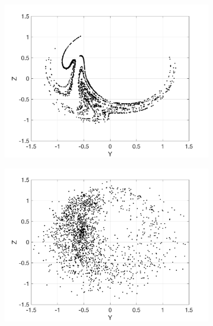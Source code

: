 \documentclass[12pt]{article}
\begin{document}
\begin{figure}[H]
	\centering
	\begin{subfigure}[b]{0.3\textwidth}
		\centering
		\includegraphics[width=\textwidth]{plots/l84l63/poincare_yz_u.png}
	\end{subfigure}
	\hfill
	\begin{subfigure}[b]{0.3\textwidth}
		\centering
		\includegraphics[width=\textwidth]{plots/l84l63/poincare_yz_c.png}
	\end{subfigure}
	\hfill
	\begin{subfigure}[b]{0.3\textwidth}
		\centering

\end{subfigure}
\end{figure}
\end{document}
